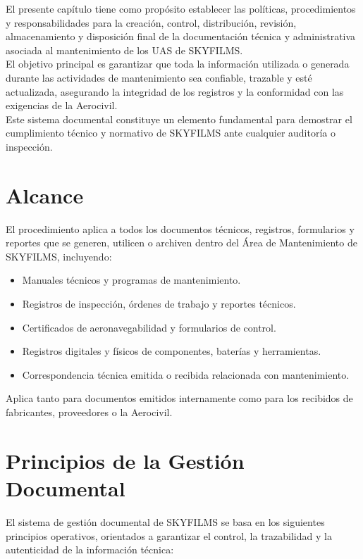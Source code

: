 

El presente capítulo tiene como propósito establecer las políticas, procedimientos y responsabilidades para la creación, control, distribución, revisión, almacenamiento y disposición final de la documentación técnica y administrativa asociada al mantenimiento de los UAS de SKYFILMS.\\

El objetivo principal es garantizar que toda la información utilizada o generada durante las actividades de mantenimiento sea confiable, trazable y esté actualizada, asegurando la integridad de los registros y la conformidad con las exigencias de la Aerocivil.\\

Este sistema documental constituye un elemento fundamental para demostrar el cumplimiento técnico y normativo de SKYFILMS ante cualquier auditoría o inspección.

\section{Alcance}
El procedimiento aplica a todos los documentos técnicos, registros, formularios y reportes que se generen, utilicen o archiven dentro del Área de Mantenimiento de SKYFILMS, incluyendo:

\begin{itemize}
    \item Manuales técnicos y programas de mantenimiento.

    \item Registros de inspección, órdenes de trabajo y reportes técnicos.

    \item Certificados de aeronavegabilidad y formularios de control.

    \item Registros digitales y físicos de componentes, baterías y herramientas.

    \item Correspondencia técnica emitida o recibida relacionada con mantenimiento.
\end{itemize}

Aplica tanto para documentos emitidos internamente como para los recibidos de fabricantes, proveedores o la Aerocivil.

\section{Principios de la Gestión Documental}
El sistema de gestión documental de SKYFILMS se basa en los siguientes principios operativos, orientados a garantizar el control, la trazabilidad y la autenticidad de la información técnica:

